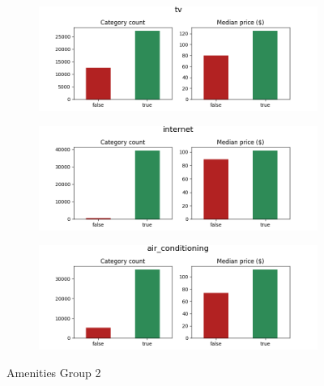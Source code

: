 \begin{figure}[H]
    \centering
    \begin{subfigure}[b]{0.3\textwidth}
        \centering
        \includegraphics[width=\textwidth]{figures/amenities/group2/tv.png}
    \end{subfigure}
    \hfill
    \begin{subfigure}[b]{0.3\textwidth}
        \centering
        \includegraphics[width=\textwidth]{figures/amenities/group2/internets.png}
    \end{subfigure}
    \hfill
    \begin{subfigure}[b]{0.3\textwidth}
        \centering
        \includegraphics[width=\textwidth]{figures/amenities/group2/air_conditioning.png}
    \end{subfigure}

    \caption{Amenities Group 2}
    \label{fig:amenities-group2}
\end{figure}

